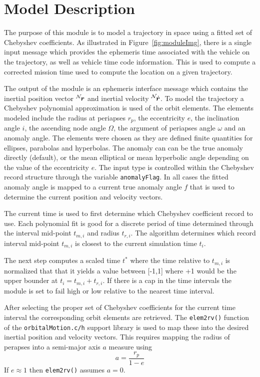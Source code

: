 


\section{Model Description}
The purpose of this module is to model a trajectory in space using a fitted set of Chebyshev coefficients.  As illustrated in Figure~\ref{fig:moduleImg}, there is a single input message which provides the ephemeris time associated with the vehicle on the trajectory, as well as vehicle time code information.  This is used to compute a corrected mission time used to compute the location on a given trajectory.

The output of the module is an ephemeris interface message which contains the inertial position vector $\leftexp{N}{\bm r}$ and inertial velocity $\leftexp{N}{\dot{\bm r}}$.  To model the trajectory  a Chebyshev polynomial approximation is used of the orbit elements.  The elements modeled include the radius at periapses $r_{p}$, the eccentricity $e$, the inclination angle $i$, the ascending node angle $\Omega$, the argument of periapses angle $\omega$ and an anomaly angle. The elements were chosen as they are defined finite quantities for ellipses, parabolas and hyperbolas.  The anomaly can can be the true anomaly directly (default), or the mean elliptical or mean hyperbolic angle depending on the value of the eccentricity $e$.  The input type is controlled within the Chebyshev record structure through the variable {\tt anomalyFlag}.  In all cases the fitted anomaly angle is mapped to a current true anomaly angle $f$ that is used to determine the current position and velocity vectors. 

The current time is used to first determine which Chebyshev coefficient record to use.  Each polynomial fit is good for a discrete period of time determined through the interval mid-point $t_{m,i}$ and radius $t_{r,i}$.   The algorithm determines which record interval mid-point $t_{m,i}$ is closest to the current simulation time $t_{i}$.  

The next step computes a scaled time $t^{\ast}$ where the time relative to $t_{m,i}$ is normalized that that it yields a value between [-1,1] where +1 would be the upper bounder at $t_{i} = t_{m,i} + t_{r,i}$.  If there is a cap in the time intervals the module is set to fail high or low relative to the nearest time interval. 


After selecting the proper set of Chebyshev coefficients for the current time interval the corresponding orbit elements are retrieved.  The {\tt elem2rv()} function of the {\tt orbitalMotion.c/h} support library is used to map these into the desired inertial position and velocity vectors.  This requires mapping the radius of perapses into a semi-major axis $a$ measure using
\begin{equation}
	a = \frac{r_{p}}{1-e}
\end{equation}
If $e \approx 1$ then {\tt elem2rv()} assumes $a = 0$.  
